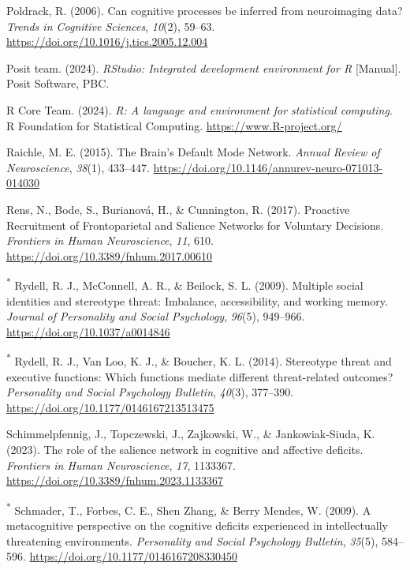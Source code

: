 \documentclass[
  stu, a4paper,floatsintext]{apa7}
\newlength{\cslhangindent}
\newenvironment{CSLReferences}[2] %
 {\begin{list}{}{%
  \setlength{\itemindent}{0pt}
  \setlength{\leftmargin}{0pt}
  \setlength{\parsep}{0pt}
  \ifodd #1
   \setlength{\leftmargin}{\cslhangindent}
   \setlength{\itemindent}{-1\cslhangindent}
  \fi
  \setlength{\itemsep}{#2\baselineskip}}}
 {\end{list}}
\begin{document}
\begin{CSLReferences}{1}{0}
Poldrack, R. (2006). Can cognitive processes be inferred from neuroimaging data? \emph{Trends in Cognitive Sciences}, \emph{10}(2), 59--63. \url{https://doi.org/10.1016/j.tics.2005.12.004}

Posit team. (2024). \emph{{RStudio}: {Integrated} development environment for {R}} {[}Manual{]}. Posit Software, PBC.

R Core Team. (2024). \emph{R: A language and environment for statistical computing}. R Foundation for Statistical Computing. \url{https://www.R-project.org/}

Raichle, M. E. (2015). The {Brain}'s {Default Mode Network}. \emph{Annual Review of Neuroscience}, \emph{38}(1), 433--447. \url{https://doi.org/10.1146/annurev-neuro-071013-014030}

Rens, N., Bode, S., Burianová, H., \& Cunnington, R. (2017). Proactive {Recruitment} of {Frontoparietal} and {Salience Networks} for {Voluntary Decisions}. \emph{Frontiers in Human Neuroscience}, \emph{11}, 610. \url{https://doi.org/10.3389/fnhum.2017.00610}

\textsuperscript{*} Rydell, R. J., McConnell, A. R., \& Beilock, S. L. (2009). Multiple social identities and stereotype threat: {Imbalance}, accessibility, and working memory. \emph{Journal of Personality and Social Psychology}, \emph{96}(5), 949--966. \url{https://doi.org/10.1037/a0014846}

\textsuperscript{*} Rydell, R. J., Van Loo, K. J., \& Boucher, K. L. (2014). Stereotype threat and executive functions: {Which} functions mediate different threat-related outcomes? \emph{Personality and Social Psychology Bulletin}, \emph{40}(3), 377--390. \url{https://doi.org/10.1177/0146167213513475}

Schimmelpfennig, J., Topczewski, J., Zajkowski, W., \& Jankowiak-Siuda, K. (2023). The role of the salience network in cognitive and affective deficits. \emph{Frontiers in Human Neuroscience}, \emph{17}, 1133367. \url{https://doi.org/10.3389/fnhum.2023.1133367}

\textsuperscript{*} Schmader, T., Forbes, C. E., Shen Zhang, \& Berry Mendes, W. (2009). A metacognitive perspective on the cognitive deficits experienced in intellectually threatening environments. \emph{Personality and Social Psychology Bulletin}, \emph{35}(5), 584--596. \url{https://doi.org/10.1177/0146167208330450}


\end{CSLReferences}
\end{document}
